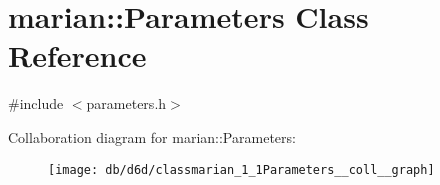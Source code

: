 \hypertarget{classmarian_1_1Parameters}{}\section{marian\+:\+:Parameters Class Reference}
\label{classmarian_1_1Parameters}


{\ttfamily \#include $<$parameters.\+h$>$}



Collaboration diagram for marian\+:\+:Parameters\+:
\nopagebreak
\begin{figure}[H]
\begin{center}
\leavevmode
\texttt{[image: db/d6d/classmarian\_1\_1Parameters\_\_coll\_\_graph]}
\end{center}
\end{figure}
